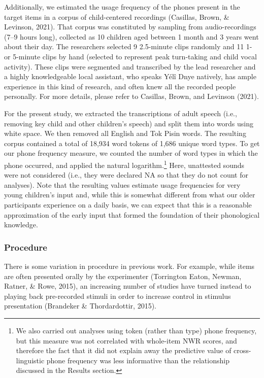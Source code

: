 \documentclass[
  american,
  ,man,floatsintext]{apa6}
\begin{document}
Additionally, we estimated the usage frequency of the phones present in the target items in a corpus of child-centered recordings (Casillas, Brown, \& Levinson, 2021). That corpus was constituted by sampling from audio-recordings (7--9 hours long), collected as 10 children aged between 1 month and 3 years went about their day. The researchers selected 9 2.5-minute clips randomly and 11 1- or 5-minute clips by hand (selected to represent peak turn-taking and child vocal activity). These clips were segmented and transcribed by the lead researcher and a highly knowledgeable local assistant, who speaks Yélî Dnye natively, has ample experience in this kind of research, and often knew all the recorded people personally. For more details, please refer to Casillas, Brown, and Levinson (2021).

For the present study, we extracted the transcriptions of adult speech (i.e., removing key child and other children's speech) and split them into words using white space. We then removed all English and Tok Pisin words. The resulting corpus contained a total of 18,934 word tokens of 1,686 unique word types. To get our phone frequency measure, we counted the number of word types in which the phone occurred, and applied the natural logarithm.\footnote{We also carried out analyses using token (rather than type) phone frequency, but this measure was not correlated with whole-item NWR scores, and therefore the fact that it did not explain away the predictive value of cross-linguistic phone frequency was less informative than the relationship discussed in the Results section.} Here, unattested sounds were not considered (i.e., they were declared NA so that they do not count for analyses). Note that the resulting values estimate usage frequencies for very young children's input and, while this is somewhat different from what our older participants experience on a daily basis, we can expect that this is a reasonable approximation of the early input that formed the foundation of their phonological knowledge.

\hypertarget{procedure}{%
\subsubsection{Procedure}\label{procedure}}

There is some variation in procedure in previous work. For example, while items are often presented orally by the experimenter (Torrington Eaton, Newman, Ratner, \& Rowe, 2015), an increasing number of studies have turned instead to playing back pre-recorded stimuli in order to increase control in stimulus presentation (Brandeker \& Thordardottir, 2015).
\end{document}
